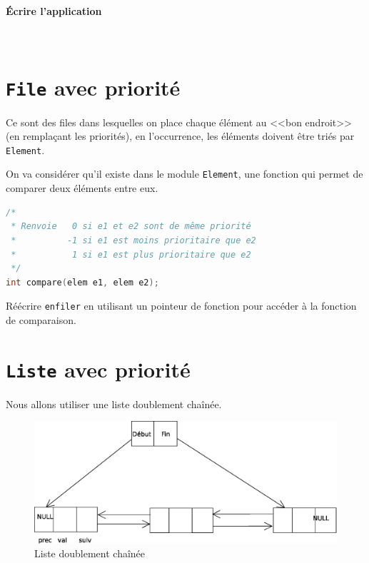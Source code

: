 
\paragraph{Écrire l'application} ~

\section{\texttt{File} avec priorité}
Ce sont des files dans lesquelles on place chaque élément au <<bon endroit>> (en remplaçant les priorités), en l'occurrence, les éléments doivent être triés par
\texttt{Element}.

On va considérer qu'il existe dans le module \texttt{Element}, une fonction qui permet de comparer deux éléments entre eux.
\begin{lstlisting}[language=C, numbers=none,caption=Element -- Prototype \texttt{comparer}]
/*
 * Renvoie   0 si e1 et e2 sont de même priorité
 *			-1 si e1 est moins prioritaire que e2
 *           1 si e1 est plus prioritaire que e2
 */
int compare(elem e1, elem e2);
\end{lstlisting}
Réécrire \texttt{enfiler} en utilisant un pointeur de fonction pour accéder à la fonction de comparaison.
\section{\texttt{Liste} avec priorité}
Nous allons utiliser une liste doublement chaînée.
\begin{figure}[H]
	\centering
\includegraphics[width=15cm]{content/schemas/fileDoubleChaine.eps}
	\caption{Liste doublement chaînée}
\end{figure}

